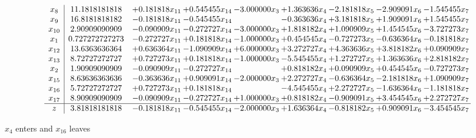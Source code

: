 \documentclass[10pt]{article}
\begin{document}
 \[\begin{array}{c| c c@{\hskip 2pt} c@{\hskip 2pt} c@{\hskip 2pt} c@{\hskip 2pt} c@{\hskip 2pt} c@{\hskip 2pt} c@{\hskip 2pt} }
 x_{8}   &  11.1818181818 & + 0.181818 x_{11} & + 0.545455 x_{14} & -3.000000 x_{3} & + 1.363636 x_{4} & -2.181818 x_{5} & -2.909091 x_{6} & -1.545455 x_{7}\\
 x_{9}   &  16.8181818182 & -0.181818 x_{11} & -0.545455 x_{14} &   & -0.363636 x_{4} & + 3.181818 x_{5} & + 1.909091 x_{6} & + 1.545455 x_{7}\\
 x_{10}   &  2.90909090909 & -0.090909 x_{11} & -0.272727 x_{14} & -3.000000 x_{3} & + 1.818182 x_{4} & + 1.090909 x_{5} & + 1.454545 x_{6} & -3.727273 x_{7}\\
 x_{1}   &  0.727272727273 & -0.272727 x_{11} & + 0.181818 x_{14} & -1.000000 x_{3} & + 0.454545 x_{4} & -0.727273 x_{5} & -0.636364 x_{6} & -0.181818 x_{7}\\
 x_{12}   &  13.6363636364 & + 0.636364 x_{11} & -1.090909 x_{14} & + 6.000000 x_{3} & + 3.272727 x_{4} & + 4.363636 x_{5} & + 3.818182 x_{6} & + 0.090909 x_{7}\\
 x_{13}   &  8.72727272727 & + 0.727273 x_{11} & + 0.181818 x_{14} & -1.000000 x_{3} & -5.545455 x_{4} & + 1.272727 x_{5} & + 1.363636 x_{6} & + 2.818182 x_{7}\\
 x_{2}   &  1.90909090909 & -0.090909 x_{11} & -0.272727 x_{14} &   & + 0.818182 x_{4} & + 0.090909 x_{5} & + 0.454545 x_{6} & -0.727273 x_{7}\\
 x_{15}   &  8.63636363636 & -0.363636 x_{11} & + 0.909091 x_{14} & -2.000000 x_{3} & + 2.272727 x_{4} & -0.636364 x_{5} & -2.181818 x_{6} & + 1.090909 x_{7}\\
 x_{16}   &  5.72727272727 & + 0.727273 x_{11} & + 0.181818 x_{14} &   & -4.545455 x_{4} & + 2.272727 x_{5} & -1.636364 x_{6} & -1.181818 x_{7}\\
 x_{17}   &  8.90909090909 & -0.090909 x_{11} & -0.272727 x_{14} & + 1.000000 x_{3} & + 0.818182 x_{4} & -0.909091 x_{5} & + 3.454545 x_{6} & + 2.272727 x_{7}\\
\hline
z    &  3.81818181818 & -0.181818 x_{11} & -0.545455 x_{14} & -2.000000 x_{3} & + 1.636364 x_{4} & -0.818182 x_{5} & + 0.909091 x_{6} & -3.454545 x_{7}\\
\end{array}\]


 $ x_{4} $ enters and $ x_{16} $ leaves 
\end{document}
